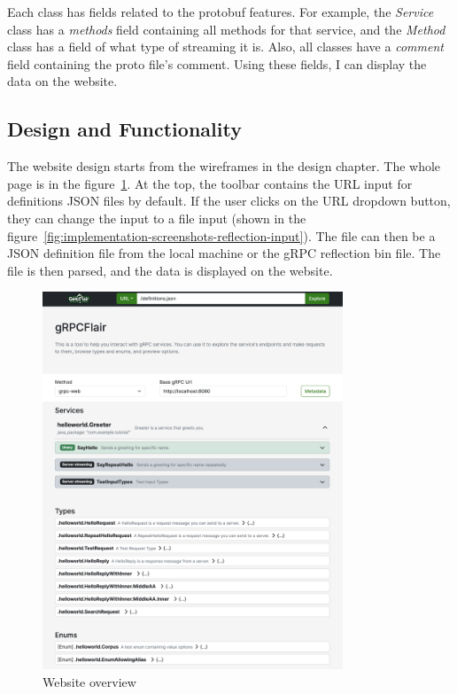 Each class has fields related to the protobuf features.
For example, the \textit{Service} class has a \textit{methods} field containing all methods for that service, and the \textit{Method} class has a field of what type of streaming it is.
Also, all classes have a \textit{comment} field containing the proto file's comment.
Using these fields, I can display the data on the website.

\subsection{Design and Functionality}
The website design starts from the wireframes in the design chapter.
The whole page is in the figure~\ref{fig:implementation-screenshots-fullpage}.
At the top, the toolbar contains the URL input for definitions JSON files by default.
If the user clicks on the URL dropdown button, they can change the input to a file input (shown in the figure~\ref{fig:implementation-screenshots-reflection-input}).
The file can then be a JSON definition file from the local machine or the gRPC reflection bin file.
The file is then parsed, and the data is displayed on the website.

\begin{figure}[!htb]
    \centering
    \captionsetup{justification=centering}
    \includegraphics[width=0.8\textwidth]{images/implementation/screenshots/fullpage}
    \caption{Website overview}
    \label{fig:implementation-screenshots-fullpage}
\end{figure}

